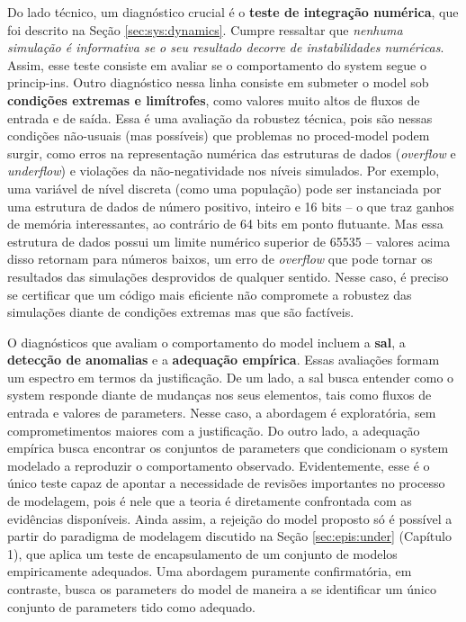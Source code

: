 \documentclass[./main.tex]{subfiles}
\begin{document}
\par Do lado técnico, um diagnóstico crucial é o \textbf{teste de integração numérica}, que foi descrito na Seção \ref{sec:sys:dynamics}. Cumpre ressaltar que \textit{nenhuma simulação é informativa se o seu resultado decorre de instabilidades numéricas}. Assim, esse teste consiste em avaliar se o comportamento do \gls{system} segue o \gls{princip-ins}. Outro diagnóstico nessa linha consiste em submeter o \gls{model} sob \textbf{condições extremas e limítrofes}, como valores muito altos de fluxos de entrada e de saída. Essa é uma avaliação da robustez técnica, pois são nessas condições não-usuais (mas possíveis) que problemas no \gls{proced-model} podem surgir, como erros na representação numérica das estruturas de dados (\textit{overflow} e \textit{underflow}) e violações da não-negatividade nos níveis simulados. Por exemplo, uma variável de nível discreta (como uma população) pode ser instanciada por uma estrutura de dados de número positivo, inteiro e 16 bits -- o que traz ganhos de memória interessantes, ao contrário de 64 bits em ponto flutuante. Mas essa estrutura de dados possui um limite numérico superior de 65535 -- valores acima disso retornam para números baixos, um erro de \textit{overflow} que pode tornar os resultados das simulações desprovidos de qualquer sentido. Nesse caso, é preciso se certificar que um código mais eficiente não compromete a robustez das simulações diante de condições extremas mas que são factíveis.

\par O diagnósticos que avaliam o comportamento do \gls{model} incluem a \textbf{\gls{sal}}, a \textbf{detecção de anomalias} e a \textbf{adequação empírica}. Essas avaliações formam um espectro em termos da justificação. De um lado, a \gls{sal} busca entender como o \gls{system} responde diante de mudanças nos seus elementos, tais como fluxos de entrada e valores de \gls{parameters}. Nesse caso, a abordagem é exploratória, sem comprometimentos maiores com a justificação. Do outro lado, a adequação empírica busca encontrar os conjuntos de \gls{parameters} que condicionam o \gls{system} modelado a reproduzir o comportamento observado. Evidentemente, esse é o único teste capaz de apontar a necessidade de revisões importantes no processo de modelagem, pois é nele que a \gls{teoria} é diretamente confrontada com as evidências disponíveis. Ainda assim, a rejeição do \gls{model} proposto só é possível a partir do \gls{paradigma} de modelagem discutido na Seção \ref{sec:epis:under} (Capítulo 1), que aplica um teste de encapsulamento de um conjunto de modelos empiricamente adequados. Uma abordagem puramente confirmatória, em contraste, busca  os \gls{parameters} do \gls{model} de maneira a se identificar um único conjunto de \gls{parameters} tido como adequado.
\end{document}
